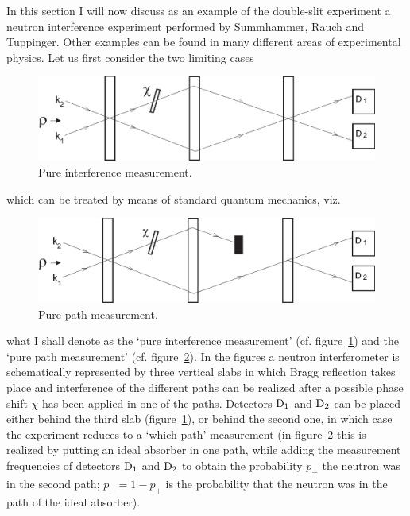 \documentclass[12pt]{article}
\begin{document}
{In this section I will now discuss as an example of the
double-slit experiment a neutron interference experiment performed
by Summhammer, Rauch and Tuppinger\cite{SuRaTu}. Other examples
can be found in many different areas of experimental
physics\cite{dM2002}. Let us first consider the two limiting cases
\begin{figure}
\centerline{\includegraphics[width=5in]{muijn100a.eps}}
 \caption{Pure interference measurement.}
  \label{fig1}
\end{figure}
which can be treated by means of standard quantum mechanics, viz.
\begin{figure}
\centerline{\includegraphics[width=5in]{muijn111a.eps}}
 \caption{Pure path measurement.}
  \label{fig2}
\end{figure}
what I shall denote as the `pure interference measurement' (cf.
figure~\ref{fig1}) and the `pure path measurement' (cf.
figure~\ref{fig2}). In the figures a neutron interferometer is
schematically represented by three vertical slabs in which Bragg
reflection takes place and interference of the different paths can
be realized after a possible phase shift $\chi$ has been applied
in one of the paths. Detectors $\rm D_1$ and $\rm D_2$ can be
placed either behind the third slab (figure~\ref{fig1}), or behind
the second one, in which case the experiment reduces to a
`which-path' measurement (in figure~\ref{fig2} this is realized by
putting an ideal absorber in one path, while adding the
measurement frequencies of detectors $\rm D_1$ and $\rm D_2$ to
obtain the probability $p_+$ the neutron was in the second path;
$p_- = 1-p_+$ is the probability that the neutron was in the path
of the ideal absorber).

}
\end{document}
